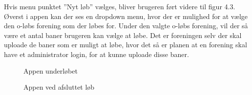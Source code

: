 Hvis menu punktet ”Nyt løb” vælges, bliver brugeren ført videre til figur 4.3. Øverst i appen kan der ses en dropdown menu, hvor der er mulighed for at vælge den o-løbs forening som der løbes for. Under den valgte o-løbs forening, vil der så være et antal baner brugeren kan vælge at løbe. Det er foreningen selv der skal uploade de baner som er muligt at løbe, hvor det så er planen at en forening skal have et administrator login, for at kunne uploade disse baner.

\begin{figure}
\centering
\begin{minipage}{.5\textwidth}
  \centering
  \caption{Appen underløbet}
  \label{fig:test1}
\end{minipage}%
\begin{minipage}{.5\textwidth}
  \centering
  \caption{Appen ved afsluttet løb}
  \label{fig:test2}
\end{minipage}
\end{figure}

